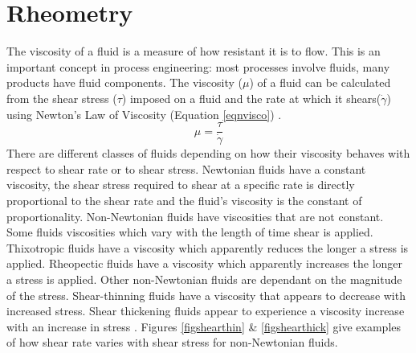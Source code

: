 \documentclass[twoside,a4]{report}
\def\br{\newline \newline \noindent}
\begin{document}
	\section*{Rheometry} %
	The viscosity of a fluid is a measure of how resistant it is to flow. This is an important concept in process engineering: most processes involve fluids, many products have fluid components. The viscosity (\(\mu\)) of a fluid can be calculated from the shear stress (\(\tau\)) imposed on a fluid and the rate at which it shears(\(\dot{\gamma}\)) using Newton's Law of Viscosity (Equation \ref{eqnvisco}) \cite{backfluidmech}.
	\begin{equation}
	\mu = \frac{\tau}{\dot{\gamma}}
	\label{eqnvisco}
	\end{equation}
	There are different classes of fluids depending on how their viscosity behaves with respect to shear rate or to shear stress. Newtonian fluids have a constant viscosity, the shear stress required to shear at a specific rate is directly proportional to the shear rate and the fluid's viscosity is the constant of proportionality. Non-Newtonian fluids have viscosities that are not constant. Some fluids viscosities which vary with the length of time shear is applied. Thixotropic fluids have a viscosity which apparently reduces the longer a stress is applied. Rheopectic fluids have a viscosity which apparently increases the longer a stress is applied. Other non-Newtonian fluids are dependant on the magnitude of the stress. Shear-thinning fluids have a viscosity that appears to decrease with increased stress. Shear thickening fluids appear to experience a viscosity increase with an increase in stress \cite{backtypesofnonnewt}. Figures \ref{figshearthin} \& \ref{figshearthick} give examples of how shear rate varies with shear stress for non-Newtonian fluids. \br
\end{document}
